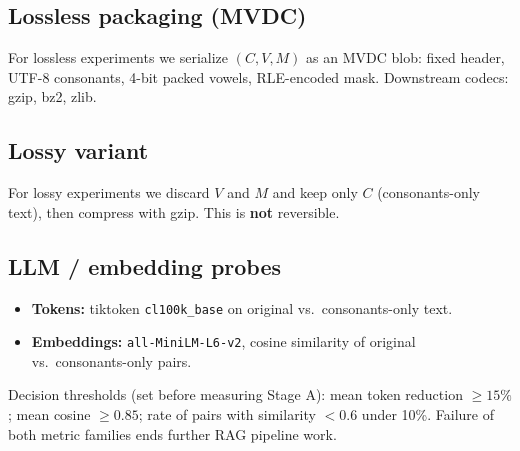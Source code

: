\documentclass{article}
\begin{document}
\subsection{Lossless packaging (MVDC)}

For lossless experiments we serialize $(C,V,M)$ as an MVDC blob: fixed header, UTF-8 consonants, 4-bit packed vowels, RLE-encoded mask. Downstream codecs: gzip, bz2, zlib.

\subsection{Lossy variant}

For lossy experiments we discard $V$ and $M$ and keep only $C$ (consonants-only text), then compress with gzip. This is \textbf{not} reversible.

\subsection{LLM / embedding probes}

\begin{itemize}
	\item \textbf{Tokens:} tiktoken \texttt{cl100k\_base} on original vs.\ consonants-only text.
	\item \textbf{Embeddings:} \texttt{all-MiniLM-L6-v2}, cosine similarity of original vs.\ consonants-only pairs.
\end{itemize}

Decision thresholds (set before measuring Stage A): mean token reduction $\geq 15\%$; mean cosine $\geq 0.85$; rate of pairs with similarity $< 0.6$ under 10\%. Failure of both metric families ends further RAG pipeline work.
\end{document}
